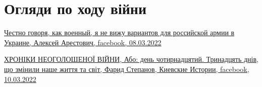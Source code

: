  
 
 
 
 
\section{Огляди по ходу війни}

\hyperlink{08_03_2022.fb.arestovich_alexei.1.varianty}{%
Честно говоря, как военный, я не вижу вариантов для российской армии в Украине, Алексей Арестович, %
facebook, 08.03.2022%
}

\hyperlink{10_03_2022.fb.fb_group.story_kiev_ua.1.hroniki}{%
ХРОНІКИ НЕОГОЛОШЕНОЇ ВІЙНИ, Або: день чотирнадцятий. Тринадцять днів, що змінили наше життя та світ, %
Фарид Степанов, Киевские Истории, facebook, 10.03.2022%
}
